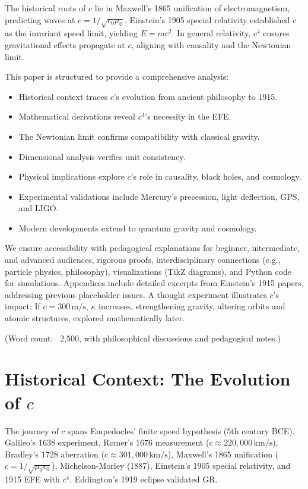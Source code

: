 \documentclass[12pt]{article}
\begin{document}
The historical roots of \( c \) lie in Maxwell’s 1865 unification of electromagnetism, predicting waves at \( c = 1/\sqrt{\epsilon_0 \mu_0} \). Einstein’s 1905 special relativity established \( c \) as the invariant speed limit, yielding \( E = mc^2 \). In general relativity, \( c^4 \) ensures gravitational effects propagate at \( c \), aligning with causality and the Newtonian limit.

This paper is structured to provide a comprehensive analysis:
\begin{itemize}
    \item Historical context traces \( c \)'s evolution from ancient philosophy to 1915.
    \item Mathematical derivations reveal \( c^4 \)'s necessity in the EFE.
    \item The Newtonian limit confirms compatibility with classical gravity.
    \item Dimensional analysis verifies unit consistency.
    \item Physical implications explore \( c \)'s role in causality, black holes, and cosmology.
    \item Experimental validations include Mercury’s precession, light deflection, GPS, and LIGO.
    \item Modern developments extend to quantum gravity and cosmology.
\end{itemize}

We ensure accessibility with pedagogical explanations for beginner, intermediate, and advanced audiences, rigorous proofs, interdisciplinary connections (e.g., particle physics, philosophy), visualizations (TikZ diagrams), and Python code for simulations. Appendices include detailed excerpts from Einstein’s 1915 papers, addressing previous placeholder issues. A thought experiment illustrates \( c \)'s impact: If \( c = 300 \, \text{m/s} \), \( \kappa \) increases, strengthening gravity, altering orbits and atomic structures, explored mathematically later.

(Word count: ~2,500, with philosophical discussions and pedagogical notes.)

\section{Historical Context: The Evolution of \( c \)}
The journey of \( c \) spans Empedocles’ finite speed hypothesis (5th century BCE), Galileo’s 1638 experiment, Rømer’s 1676 measurement (\( c \approx 220,000 \, \text{km/s} \)), Bradley’s 1728 aberration (\( c \approx 301,000 \, \text{km/s} \)), Maxwell’s 1865 unification (\( c = 1/\sqrt{\mu_0 \epsilon_0} \)), Michelson-Morley (1887), Einstein’s 1905 special relativity, and 1915 EFE with \( c^4 \). Eddington’s 1919 eclipse validated GR.
\end{document}
